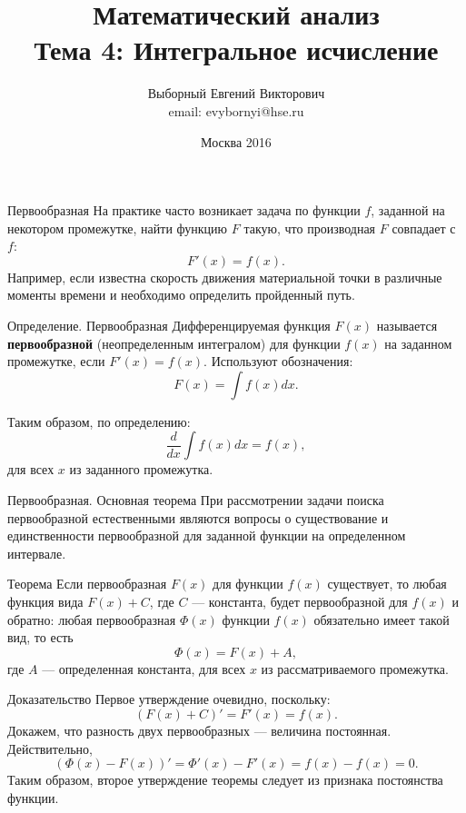 \documentclass[8pt]{beamer}
\title[Интегральное исчисление]{Математический анализ\\ Тема 4: Интегральное исчисление}
\author[Выборный Е. В.]{Выборный Евгений Викторович\\ email: evybornyi@hse.ru}
\date{Москва 2016}
\begin{document}

\begin{frame}
\titlepage
\end{frame}

\begin{frame}{Первообразная}
На практике часто возникает задача по функции $f$, заданной на некотором промежутке, найти функцию $F$ такую, что производная $F$ совпадает с $f$:
$$F'(x) = f(x).$$
Например, если известна скорость движения материальной точки в различные моменты времени и необходимо определить пройденный путь.

\begin{block}{Определение. Первообразная}
Дифференцируемая функция $F(x)$ называется {\bf первообразной} (неопределенным интегралом) для функции $f(x)$ на заданном промежутке, если $F'(x)=f(x)$.
Используют обозначения:
$$F(x) = \int f(x)dx.$$
\end{block}
Таким образом, по определению:
$$\frac{d}{dx}\int f(x)dx = f(x),$$
для всех $x$ из заданного промежутка.
\end{frame}

\begin{frame}{Первообразная. Основная теорема}
При рассмотрении задачи поиска первообразной естественными являются вопросы о существование и единственности первообразной для заданной функции на определенном интервале.

\begin{block}{Теорема}
Если первообразная $F(x)$ для функции $f(x)$ существует, то любая функция вида $F(x) + C$, где $C$ --- константа, будет первообразной для $f(x)$ и обратно: любая первообразная $\Phi(x)$ функции $f(x)$ обязательно имеет такой вид, то есть
$$\Phi(x)=F(x)+A,$$
где $A$ --- определенная константа, для всех $x$ из рассматриваемого промежутка.
\end{block}

\begin{block}{Доказательство}
Первое утверждение очевидно, поскольку:
$$\left( F(x)+C \right)' = F'(x) = f(x).$$
Докажем, что разность двух первообразных --- величина постоянная. Действительно, $$\left(\Phi(x) - F(x) \right)' =\Phi'(x)  - F'(x) = f(x) - f(x) = 0.$$
Таким образом, второе утверждение теоремы следует из признака постоянства функции.
\end{block}

\end{frame}
\end{document}
